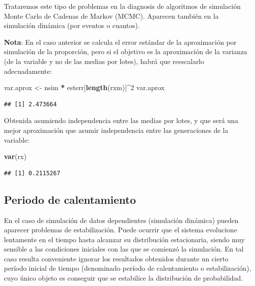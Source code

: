\documentclass[]{book}
\newenvironment{Shaded}{\begin{snugshade}}{\end{snugshade}}
\newcommand{\KeywordTok}[1]{\textcolor[rgb]{0.13,0.29,0.53}{\textbf{#1}}}
\newcommand{\DecValTok}[1]{\textcolor[rgb]{0.00,0.00,0.81}{#1}}
\newcommand{\StringTok}[1]{\textcolor[rgb]{0.31,0.60,0.02}{#1}}
\newcommand{\OperatorTok}[1]{\textcolor[rgb]{0.81,0.36,0.00}{\textbf{#1}}}
\newcommand{\NormalTok}[1]{#1}
\theoremstyle{definition}
\theoremstyle{definition}
\theoremstyle{definition}
\theoremstyle{remark}
\begin{document}
Trataremos este tipo de problemas en la diagnosis de algoritmos de
simulación Monte Carlo de Cadenas de Markov (MCMC). Aparecen también en
la simulación dinámica (por eventos o cuantos).

\textbf{Nota}: En el caso anterior se calcula el error estándar de la
aproximación por simulación de la proporción, pero si el objetivo es la
aproximación de la varianza (de la variable y no de las medias por
lotes), habrá que reescalarlo adecuadamente:

\begin{Shaded}
\begin{Highlighting}[]
\NormalTok{var.aprox <-}\StringTok{ }\NormalTok{nsim }\OperatorTok{*}\StringTok{ }\NormalTok{esterr[}\KeywordTok{length}\NormalTok{(rxm)]}\OperatorTok{^}\DecValTok{2}
\NormalTok{var.aprox}
\end{Highlighting}
\end{Shaded}

\begin{verbatim}
## [1] 2.473664
\end{verbatim}

Obtenida asumiendo independencia entre las medias por lotes, y que será
una mejor aproximación que asumir independencia entre las generaciones
de la variable:

\begin{Shaded}
\begin{Highlighting}[]
\KeywordTok{var}\NormalTok{(rx)}
\end{Highlighting}
\end{Shaded}

\begin{verbatim}
## [1] 0.2115267
\end{verbatim}

\subsection{Periodo de calentamiento}\label{periodo-de-calentamiento}

En el caso de simulación de datos dependientes (simulación dinámica)
pueden aparecer problemas de estabilización. Puede ocurrir que el
sistema evolucione lentamente en el tiempo hasta alcanzar su
distribución estacionaria, siendo muy sensible a las condiciones
iniciales con las que se comienzó la simulación. En tal caso resulta
conveniente ignorar los resultados obtenidos durante un cierto período
inicial de tiempo (denominado período de calentamiento o
estabilización), cuyo único objeto es conseguir que se estabilice la
distribución de probabilidad.
\end{document}
